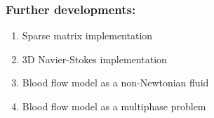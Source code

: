 \begin{frame}
 \frametitle{\LARGE Further developments:}
 \vspace{-1cm}
\begin{enumerate}
 \justifying
 \small

 
 \item Sparse matrix implementation\\

 \vspace{0.3cm}

 \item 3D Navier-Stokes implementation\\

 \vspace{0.3cm}

 \item Blood flow model as a non-Newtonian fluid\\

 \vspace{0.3cm}

 \item Blood flow model as a multiphase problem
\end{enumerate}
\end{frame}

